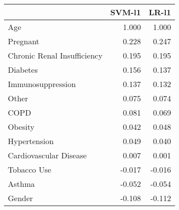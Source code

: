 \begin{tabular}{lrr}
\toprule
{} &  SVM-l1 &  LR-l1 \\
\midrule
Age                         &   1.000 &  1.000 \\
Pregnant                    &   0.228 &  0.247 \\
Chronic Renal Insufficiency &   0.195 &  0.195 \\
Diabetes                    &   0.156 &  0.137 \\
Immunosuppression           &   0.137 &  0.132 \\
Other                       &   0.075 &  0.074 \\
COPD                        &   0.081 &  0.069 \\
Obesity                     &   0.042 &  0.048 \\
Hypertension                &   0.049 &  0.040 \\
Cardiovascular Disease      &   0.007 &  0.001 \\
Tobacco Use                 &  -0.017 & -0.016 \\
Asthma                      &  -0.052 & -0.054 \\
Gender                      &  -0.108 & -0.112 \\
\bottomrule
\end{tabular}
